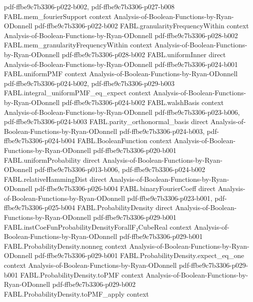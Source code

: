 \begin{theorem}
  {pdf-ffbe9c7b3306-p022-b002,
    pdf-ffbe9c7b3306-p027-b008}
\proofstep
  {FABL.mem_fourierSupport}
  {context}
  {Analysis-of-Boolean-Functions-by-Ryan-ODonnell}
  {pdf-ffbe9c7b3306-p022-b002}
\proofstep
  {FABL.granularityFrequencyWithin}
  {context}
  {Analysis-of-Boolean-Functions-by-Ryan-ODonnell}
  {pdf-ffbe9c7b3306-p028-b002}
\proofstep
  {FABL.mem_granularityFrequencyWithin}
  {context}
  {Analysis-of-Boolean-Functions-by-Ryan-ODonnell}
  {pdf-ffbe9c7b3306-p028-b002}
\proofstep
  {FABL.uniformInner}
  {direct}
  {Analysis-of-Boolean-Functions-by-Ryan-ODonnell}
  {pdf-ffbe9c7b3306-p024-b001}
\proofstep
  {FABL.uniformPMF}
  {context}
  {Analysis-of-Boolean-Functions-by-Ryan-ODonnell}
  {pdf-ffbe9c7b3306-p024-b002,
    pdf-ffbe9c7b3306-p029-b003}
\proofstep
  {FABL.integral_uniformPMF_eq_expect}
  {context}
  {Analysis-of-Boolean-Functions-by-Ryan-ODonnell}
  {pdf-ffbe9c7b3306-p024-b002}
\proofstep
  {FABL.walshBasis}
  {context}
  {Analysis-of-Boolean-Functions-by-Ryan-ODonnell}
  {pdf-ffbe9c7b3306-p023-b006,
    pdf-ffbe9c7b3306-p024-b003}
\proofstep
  {FABL.parity_orthonormal_basis}
  {direct}
  {Analysis-of-Boolean-Functions-by-Ryan-ODonnell}
  {pdf-ffbe9c7b3306-p024-b003,
    pdf-ffbe9c7b3306-p024-b004}
\proofstep
  {FABL.BooleanFunction}
  {context}
  {Analysis-of-Boolean-Functions-by-Ryan-ODonnell}
  {pdf-ffbe9c7b3306-p020-b001}
\proofstep
  {FABL.uniformProbability}
  {direct}
  {Analysis-of-Boolean-Functions-by-Ryan-ODonnell}
  {pdf-ffbe9c7b3306-p013-b006,
    pdf-ffbe9c7b3306-p024-b002}
\proofstep
  {FABL.relativeHammingDist}
  {direct}
  {Analysis-of-Boolean-Functions-by-Ryan-ODonnell}
  {pdf-ffbe9c7b3306-p026-b004}
\proofstep
  {FABL.binaryFourierCoeff}
  {direct}
  {Analysis-of-Boolean-Functions-by-Ryan-ODonnell}
  {pdf-ffbe9c7b3306-p023-b001,
    pdf-ffbe9c7b3306-p025-b004}
\proofstep
  {FABL.ProbabilityDensity}
  {direct}
  {Analysis-of-Boolean-Functions-by-Ryan-ODonnell}
  {pdf-ffbe9c7b3306-p029-b001}
\proofstep
  {FABL.instCoeFunProbabilityDensityForallF₂CubeReal}
  {context}
  {Analysis-of-Boolean-Functions-by-Ryan-ODonnell}
  {pdf-ffbe9c7b3306-p029-b001}
\proofstep
  {FABL.ProbabilityDensity.nonneg}
  {context}
  {Analysis-of-Boolean-Functions-by-Ryan-ODonnell}
  {pdf-ffbe9c7b3306-p029-b001}
\proofstep
  {FABL.ProbabilityDensity.expect_eq_one}
  {context}
  {Analysis-of-Boolean-Functions-by-Ryan-ODonnell}
  {pdf-ffbe9c7b3306-p029-b001}
\proofstep
  {FABL.ProbabilityDensity.toPMF}
  {context}
  {Analysis-of-Boolean-Functions-by-Ryan-ODonnell}
  {pdf-ffbe9c7b3306-p029-b002}
\proofstep
  {FABL.ProbabilityDensity.toPMF_apply}
  {context}

\end{theorem}

